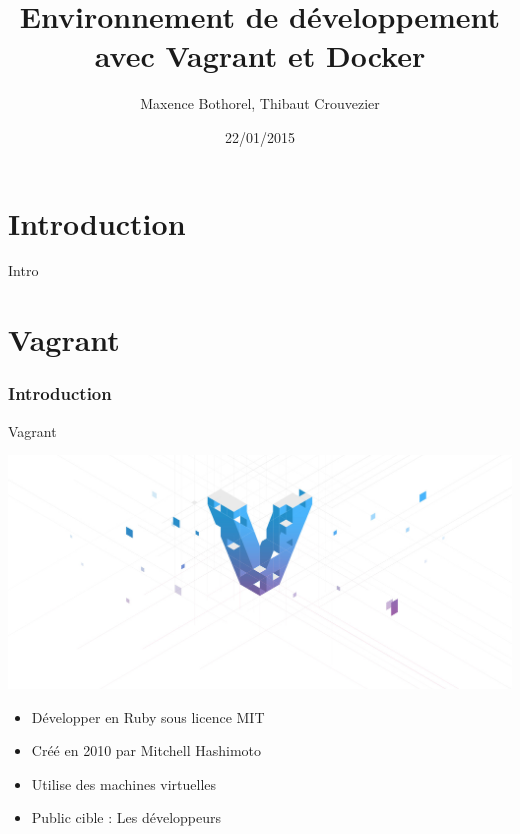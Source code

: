 \documentclass{beamer}
\title{Environnement de développement avec Vagrant et Docker}
\author{Maxence Bothorel, Thibaut Crouvezier}
\institute{Licence professionnelle ASRALL,\\
    IUT Nancy Charlemagne,\\
    Nancy}
\date{22/01/2015}
\begin{document}
    \begin{frame}
        \maketitle{}
    \end{frame}
    	
    \section{Introduction}
    	
    \begin{frame}
        Intro
    \end{frame}
    
    \section{Vagrant}
    \subsubsection{Introduction}
    
    \begin{frame}{Vagrant}
        \begin{center}
            \includegraphics[scale=0.1]{images_rapport/vagrant_logo.jpg}
        \end{center}
        \begin{itemize}
            \item{Développer en Ruby sous licence MIT}
            \item{Créé en 2010 par Mitchell Hashimoto}
            \pause
            \item{Utilise des machines virtuelles}
            \item{Public cible : Les développeurs}
        \end{itemize}
    \end{frame}
\end{document}
